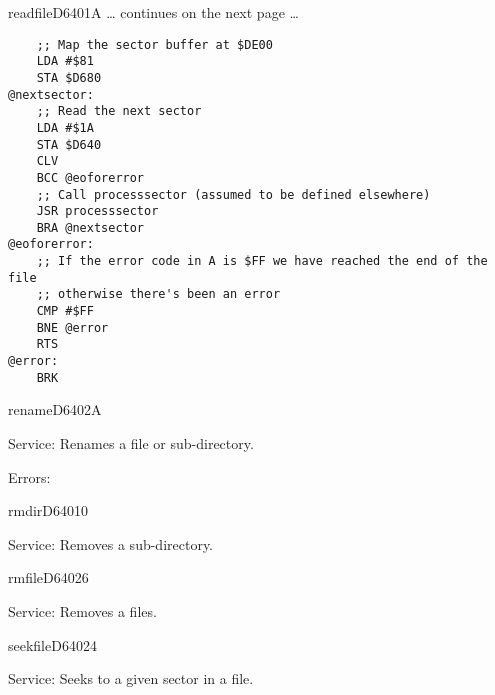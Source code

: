 \begin{hyppotrap}{readfile}{D640}{1A}
\ldots{} continues on the next page \ldots

\begin{tcolorbox}[colback=black,coltext=white]
\verbatimfont{\codefont}
\begin{verbatim}
    ;; Map the sector buffer at $DE00
    LDA #$81
    STA $D680
@nextsector:
    ;; Read the next sector
    LDA #$1A
    STA $D640
    CLV
    BCC @eoforerror
    ;; Call processsector (assumed to be defined elsewhere)
    JSR processsector
    BRA @nextsector
@eoforerror:
    ;; If the error code in A is $FF we have reached the end of the file
    ;; otherwise there's been an error
    CMP #$FF
    BNE @error
    RTS
@error:
    BRK
\end{verbatim}
\end{tcolorbox}
\end{hyppotrap}


\newpage
\begin{hyppotrap}{rename}{D640}{2A}
\item [Service:]
  Renames a file or sub-directory.
\item [Errors:]
\notimplemented
\end{hyppotrap}


\begin{hyppotrap}{rmdir}{D640}{10}
\item [Service:]
  Removes a sub-directory.
\notimplemented
\end{hyppotrap}


\begin{hyppotrap}{rmfile}{D640}{26}
\item [Service:]
  Removes a files.
\notimplemented
\end{hyppotrap}


\begin{hyppotrap}{seekfile}{D640}{24}
\item [Service:]
  Seeks to a given sector in a file.
\notimplemented
\end{hyppotrap}


